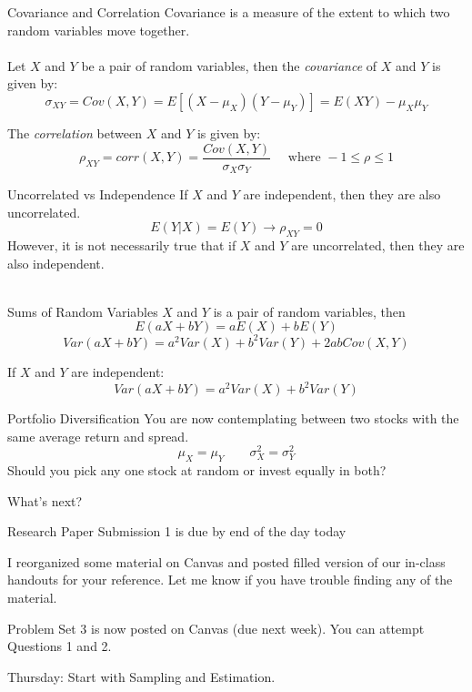 \documentclass{./../div_teaching_slides}
\begin{document}
\begin{frame}{Covariance and Correlation}
Covariance is a measure of the extent to which two random variables move
together. \\~\\
Let $X$ and $Y$ be a pair of random variables, then the \textit{covariance} of $X$ and $Y$ is given by:
$$ \sigma_{XY} = Cov(X,Y) = E[(X-\mu_X)(Y-\mu_Y)] = E(XY)-\mu_X \mu_Y $$ 
\vspace{0.15em}

The \textit{correlation} between $X$ and $Y$ is given by:
$$ \rho_{XY} = corr(X,Y) = \frac{Cov(X,Y)}{\sigma_X \sigma_Y} \quad \text{ where } -1 \leq \rho \leq 1$$
\end{frame}

\begin{frame}{Uncorrelated vs Independence}
If $X$ and $Y$ are independent, then they are also uncorrelated. 
$$ E(Y|X) = E(Y) \rightarrow \rho_{XY} = 0 $$
However, it is not necessarily true that if $X$ and $Y$ are uncorrelated, then they are also independent. \\~\\
\end{frame}

\begin{frame}{Sums of Random Variables}
$X$ and $Y$ is a pair of random variables, then
$$ E(aX+bY) = aE(X) + bE(Y) $$
$$ Var(aX+bY) = a^2Var(X) + b^2 Var(Y) + 2 ab Cov(X,Y) $$

\vspace{1em}
If $X$ and $Y$ are independent:
$$ Var(aX+bY) = a^2 Var(X) + b^2 Var(Y) $$
\end{frame}

\begin{frame}{Portfolio Diversification}
You are now contemplating between two stocks with the same average return and spread.  
$$ \mu_X = \mu_Y \quad \quad \sigma^2_X = \sigma^2_Y $$
Should you pick any one stock at random or invest equally in both?
\end{frame}

\begin{frame}{What's next?}
\begin{witemize}
  \item Research Paper Submission 1 is due by end of the day today
  \item I reorganized some material on Canvas and posted filled version of our in-class handouts for your reference. Let me know if you have trouble finding any of the material. 
  \item Problem Set 3 is now posted on Canvas (due next week). You can attempt Questions 1 and 2. 
  \item Thursday: Start with Sampling and Estimation. 
\end{witemize}

\end{frame}
\end{document}

